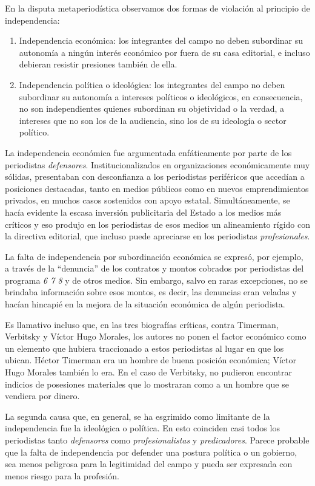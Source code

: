 En la disputa metaperiodística observamos dos formas de violación al principio de independencia:

\begin{enumerate}[label=\alph*.]
	\item Independencia económica: los integrantes del campo no deben subordinar su autonomía a ningún interés económico por fuera de su casa editorial, e incluso debieran resistir presiones también de ella.
	\item Independencia política o ideológica: los integrantes del campo no deben subordinar su autonomía a intereses políticos o ideológicos, en consecuencia, no son independientes quienes subordinan su objetividad o la verdad, a intereses que no son los de la audiencia, sino los de su ideología o sector político.
\end{enumerate}

La independencia económica fue argumentada enfáticamente por parte de los periodistas \emph{defensores}. Institucionalizados en organizaciones económicamente muy sólidas, presentaban con desconfianza a los periodistas periféricos que accedían a posiciones destacadas, tanto en medios públicos como en nuevos emprendimientos privados, en muchos casos sostenidos con apoyo estatal. Simultáneamente, se hacía evidente la escasa inversión publicitaria del Estado a los medios más críticos y eso produjo en los periodistas de esos medios un alineamiento rígido con la directiva editorial, que incluso puede apreciarse en los periodistas \emph{profesionales}.

La falta de independencia por subordinación económica se expresó, por ejemplo, a través de la ``denuncia'' de los contratos y montos cobrados por periodistas del programa \emph{6 7 8} y de otros medios. Sin embargo, salvo en raras excepciones, no se brindaba información sobre esos montos, es decir, las denuncias eran veladas y hacían hincapié en la mejora de la situación económica de algún periodista.

Es llamativo incluso que, en las tres biografías críticas, contra Timerman, Verbitsky y Víctor Hugo Morales, los autores no ponen el factor económico como un elemento que hubiera traccionado a estos periodistas al lugar en que los ubican. Héctor Timerman era un hombre de buena posición económica; Víctor Hugo Morales también lo era. En el caso de Verbitsky, no pudieron encontrar indicios de posesiones materiales que lo mostraran como a un hombre que se vendiera por dinero.

La segunda causa que, en general, se ha esgrimido como limitante de la independencia fue la ideológica o política. En esto coinciden casi todos los periodistas tanto \emph{defensores} como \emph{profesionalistas} y \emph{predicadores}. Parece probable que la falta de independencia por defender una postura política o un gobierno, sea menos peligrosa para la legitimidad del campo y pueda ser expresada con menos riesgo para la profesión.


